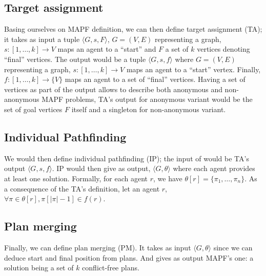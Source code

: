 \documentclass{article}
\begin{document}
\subsection{Target assignment}
Basing ourselves on MAPF definition, we can then define target assignment (TA); it takes as input a tuple \(\langle G,s,F \rangle\), \(G=(V,E)\) representing a graph, \(s : [1,\ldots,k] \rightarrow V\) maps an agent to a ``start'' and \(F\) a set of \(k\) vertices denoting ``final'' vertices.  The output would be a tuple \(\langle G,s,f \rangle \) where \(G=(V,E)\) representing a graph, \(s : [1,\ldots,k] \rightarrow V\) maps an agent to a ``start'' vertex. Finally,  \(f : [1,\ldots,k] \rightarrow \{V\}\) maps an agent to a set of ``final'' vertices. Having a set of vertices as part of the output allows to describe both anonymous and non-anonymous MAPF problems, TA's output for anonymous variant would be the set of goal vertices \(F\) itself and a singleton for non-anonymous variant.

\subsection{Individual Pathfinding}
We would then define individual pathfinding (IP); the input of would be TA's output \(\langle G,s,f \rangle \). IP would then give as output, \(\langle G, \theta \rangle \) where each agent provides at least one solution. Formally, for each agent \(r\), we have \( \theta[r] = \{\pi_1,\ldots,\pi_n\}\). As a consequence of the TA's definition, let an agent \(r\), \(\forall \pi \in \theta[r], \pi[|\pi|-1]\in f(r)\). 

\subsection{Plan merging}
Finally, we can define plan merging (PM). It takes as input \(\langle G, \theta \rangle \) since we can deduce start and final position from plans. And gives as output MAPF's one: a solution being a set of \(k\) conflict-free plans. 

\printbibliography{}
\end{document}
